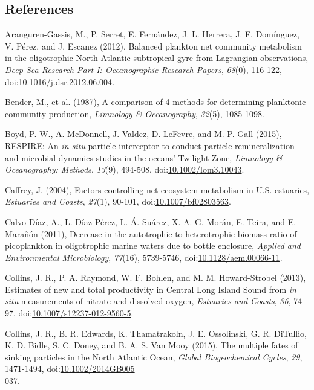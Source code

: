 \begin{singlespace}
\section*{References}
\addtocounter{section}{1}
{\setlength{\parindent}{0pt}
Aranguren-Gassis, M., P. Serret, E. Fern\'{a}ndez, J. L. Herrera, J. F. Dom\'{i}nguez, V. P\'{e}rez, and J. Escanez (2012), Balanced plankton net community metabolism in the oligotrophic North Atlantic subtropical gyre from Lagrangian observations, \emph{Deep Sea Research Part I: Oceanographic Research Papers}, \emph{68}(0), 116-122, doi:\href{http://dx.doi.org/10.1016/j.dsr.2012.06.004}{10.1016/j.dsr.2012.06.004}.

{\setlength{\parskip}{10pt}

Bender, M., et al. (1987), A comparison of 4 methods for determining planktonic community production, \emph{Limnology \& Oceanography}, \emph{32}(5), 1085-1098.

Boyd, P. W., A. McDonnell, J. Valdez, D. LeFevre, and M. P. Gall (2015), RESPIRE: An \emph{in situ} particle interceptor to conduct particle remineralization and microbial dynamics studies in the oceans' Twilight Zone, \emph{Limnology \& Oceanography: Methods}, \emph{13}(9), 494-508, doi:\href{http://dx.doi.org/10.1002/lom3.10043}{10.1002/lom3.10043}.

Caffrey, J. (2004), Factors controlling net ecosystem metabolism in U.S. estuaries, \emph{Estuaries and Coasts}, \emph{27}(1), 90-101, doi:\href{http://dx.doi.org/10.1007/bf02803563}{10.1007/bf02803563}.

Calvo-D\'{i}az, A., L. D\'{i}az-P\'{e}rez, L. \'{A}. Su\'{a}rez, X. A. G. Mor\'{a}n, E. Teira, and E. Mara\~{n}\'{o}n (2011), Decrease in the autotrophic-to-heterotrophic biomass ratio of picoplankton in oligotrophic marine waters due to bottle enclosure, \emph{Applied and Environmental Microbiology}, \emph{77}(16), 5739-5746, doi:\href{http://dx.doi.org/10.1128/aem.00066-11}{10.1128/aem.00066-11}.

Collins, J. R., P. A. Raymond, W. F. Bohlen, and M. M. Howard-Strobel (2013), Estimates of new and total productivity in Central Long Island Sound from \emph{in situ} measurements of nitrate and dissolved oxygen, \emph{Estuaries and Coasts}, \emph{36}, 74--97, doi:\href{http://dx.doi.org/s12237-012-9560-5}{10.1007/s12237-012-9560-5}.

Collins, J. R., B. R. Edwards, K. Thamatrakoln, J. E. Ossolinski, G. R. DiTullio, K. D. Bidle, S. C. Doney, and B. A. S. Van Mooy (2015), The multiple fates of sinking particles in the North Atlantic Ocean, \emph{Global Biogeochemical Cycles}, \emph{29}, 1471-1494, doi:\href{http://dx.doi.org/10.1002/2014GB005037}{10.1002/2014GB005\\037}.

}}
\end{singlespace}
